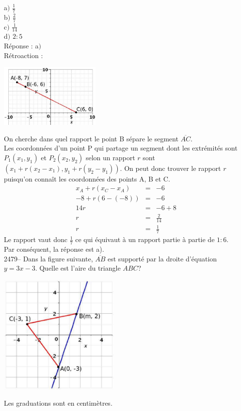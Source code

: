 \documentclass[letterpaper, 12pt]{article}
\begin{document}
a$)$ $\frac{1}{7}$\\[2mm]
b$)$ $\frac{2}{7}$\\[2mm]
c$)$ $\frac{1}{14}$\\[2mm]
d$)$ $2:5$\\

R\'eponse : a$)$\\

R\'etroaction :\\
\begin{center}
 \includegraphics[width=5cm,bb=14 14 415 267]{Q2478.eps}
\end{center}
On cherche dans quel rapport le point B s\'epare le segment $\overline{AC}$.\\
Les coordonn\'ees d'un point P qui partage un segment dont les extr\'emit\'es sont $P_{1}(x_{1}, y_{1})$ et $P_{2}(x_{2}, y_{2})$ selon un rapport $r$ sont $\left( x_{1}+r(x_{2}-x_{1}), y_{1}+r(y_{2}-y_{1})\right) $. On peut donc trouver le rapport $r$ puisqu'on conna\^it les coordonn\'ees des points A, B et C.
\begin{eqnarray*}
 x_{A}+r(x_{C}-x_{A})&=&-6\\
 -8+r(6-(-8))&=&-6\\
 14r&=&-6+8\\[2mm]
 r&=&\frac{2}{14}\\[2mm]
 r&=&\frac{1}{7}
\end{eqnarray*}
Le rapport vaut donc $\frac{1}{7}$ ce qui \'equivaut \`a un rapport partie \`a partie de $1:6$.\\
Par cons\'equent, la r\'eponse est a).\\

2479-- Dans la figure suivante, $\overline{AB}$ est support\'e par la droite d'\'equation $y=3x-3$. Quelle est l'aire du triangle $ABC$?
\begin{center}
 \includegraphics[width=6cm,bb=14 14 415 415]{Q2479q.eps}
\end{center}
Les graduations sont en centim\`etres.\\
\end{document}

